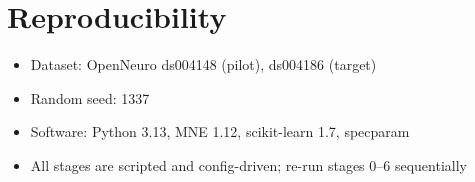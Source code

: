 \documentclass[12pt, a4paper]{article}
\begin{document}
\section{Reproducibility}

\begin{itemize}
    \item Dataset: OpenNeuro ds004148 (pilot), ds004186 (target)
    \item Random seed: 1337
    \item Software: Python 3.13, MNE 1.12, scikit-learn 1.7, specparam
    \item All stages are scripted and config-driven; re-run stages 0--6 sequentially
\end{itemize}


\end{document}
